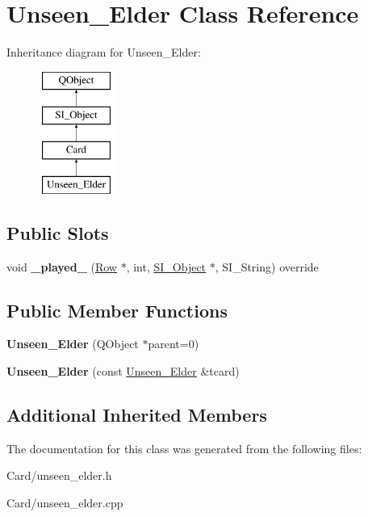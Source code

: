 \hypertarget{class_unseen___elder}{}\section{Unseen\+\_\+\+Elder Class Reference}
\label{class_unseen___elder}
Inheritance diagram for Unseen\+\_\+\+Elder\+:\begin{figure}[H]
\begin{center}
\leavevmode
\includegraphics[height=4.000000cm]{class_unseen___elder}
\end{center}
\end{figure}
\subsection*{Public Slots}
\begin{DoxyCompactItemize}
\item 
\mbox{\label{class_unseen___elder_a336ed87491ca3db4d766b47cee780b38}} 
void {\bfseries \+\_\+played\+\_\+} (\hyperlink{class_card_set}{Row} $\ast$, int, \hyperlink{class_s_i___object}{S\+I\+\_\+\+Object} $\ast$, S\+I\+\_\+\+String) override
\end{DoxyCompactItemize}
\subsection*{Public Member Functions}
\begin{DoxyCompactItemize}
\item 
\mbox{\label{class_unseen___elder_a6deaa0d4d2e50ab640b5d50933928ae7}} 
{\bfseries Unseen\+\_\+\+Elder} (Q\+Object $\ast$parent=0)
\item 
\mbox{\label{class_unseen___elder_a9583daadec4a5171982ab3f7be38e9bd}} 
{\bfseries Unseen\+\_\+\+Elder} (const \hyperlink{class_unseen___elder}{Unseen\+\_\+\+Elder} \&tcard)
\end{DoxyCompactItemize}
\subsection*{Additional Inherited Members}


The documentation for this class was generated from the following files\+:\begin{DoxyCompactItemize}
\item 
Card/unseen\+\_\+elder.\+h\item 
Card/unseen\+\_\+elder.\+cpp\end{DoxyCompactItemize}
